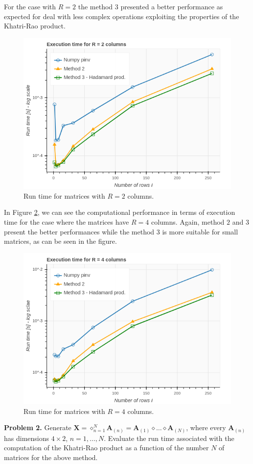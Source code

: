 \documentclass[12pt]{article}
\begin{document}
For the case with $R=2$ the method $3$ presented a better performance as 
expected for deal with less complex operations exploiting the properties of the 
Khatri-Rao product. 

\begin{figure}[H]
    \centering 
    \includegraphics[width=0.55\linewidth]{figs/r2.png}
    \caption{Run time for matrices with $R=2$ columns.}
    \label{r2}
\end{figure}

In Figure \ref{r4}, we can see the computational performance in terms of 
execution time for the case where the matrices have $R = 4$ columns. Again, 
method $2$ and $3$ present the better performances while the method 3 is more 
suitable for small matrices, as can be seen in the figure.

\begin{figure}[H]
    \centering 
    \includegraphics[width=0.55\linewidth]{figs/r4.png}
    \caption{Run time for matrices with $R=4$ columns.}
    \label{r4}
\end{figure}


\noindent
\textbf{Problem 2.} Generate $\bm{X} = \diamond^{N}_{n=1} \bm{A}_{(n)} =
\bm{A}_{(1)} \diamond \dots \diamond \bm{A}_{(N)}$, where every $\bm{A}_{(n)}$ 
has dimensions $4\times 2$, $n = 1, \dots, N$. Evaluate the run time associated 
with the computation of the Khatri-Rao product as a function of the number $N$ 
of matrices for the above method.\\
\end{document}
